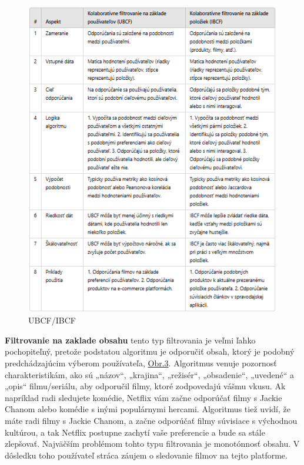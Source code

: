 \documentclass[10pt,slovak,a4paper]{article}
\begin{document}
\begin{figure}[H]
  \centering
  \includegraphics[width=1\textwidth]{Images_tables/table_Filter.png} 
  \caption{UBCF/IBCF}
\end{figure}

\textbf{Filtrovanie na zaklade obsahu} tento typ filtrovania je veľmi ľahko pochopiteľný, pretože podstatou algoritmu je odporučiť obsah, ktorý je podobný predchádzajúcim výberom používateľa, \hyperref[Types:of:filtering]{Obr.3}. Algoritmus venuje pozornosť charakteristikám, ako sú „názov“, „krajina“, „režisér“, „obsadenie“, „uvedené“ a „opis“ filmu/seriálu, aby odporučil filmy, ktoré zodpovedajú vášmu vkusu.\cite{Fil:obsah} Ak napríklad radi sledujete komédie, Netflix vám začne odporúčať filmy s Jackie Chanom alebo komédie s inými populárnymi hercami. Algoritmus tiež uvidí, že máte radi filmy s Jackie Chanom, a začne odporúčať filmy súvisiace s východnou kultúrou, a tak Netflix postupne zachytí vaše preferencie a bude sa stále zlepšovať. Najväčším problémom tohto typu filtrovania je monotónnosť obsahu. V dôsledku toho používateľ stráca záujem o sledovanie filmov na tejto platforme.\cite{Fil:alg:obsah}
\end{document}
